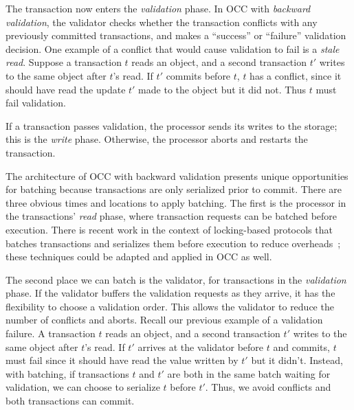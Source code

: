 The transaction now enters the \emph{validation} phase. In OCC with \emph{backward validation}, the validator checks whether the transaction conflicts with any previously committed transactions, and makes a ``success'' or ``failure'' validation decision. One example of a conflict that would cause validation to fail is a \emph{stale read}. Suppose a transaction $t$ reads an object, and a second transaction $t'$ writes to the same object after $t$'s read. If $t'$ commits before $t$, $t$ has a conflict, since it should have read the update $t'$ made to the object but it did not. Thus $t$ must fail validation. 


If a transaction passes validation, the processor sends its writes to the storage; this is the \emph{write} phase. Otherwise, the processor aborts and restarts the transaction.

The architecture of OCC with backward validation presents unique opportunities for batching because transactions are only serialized prior to commit. 
There are three obvious times and locations to apply batching. The first is the processor in the transactions' \emph{read} phase, where transaction requests can be batched before execution. There is recent work in the context of locking-based protocols that  batches transactions and serializes them before execution to reduce overheads~\cite{thomson2012calvin,faleiro2014rethinking,mu2014extracting}; these techniques could be adapted and applied in OCC as well.

The second place we can batch is the validator, for transactions in the \emph{validation} phase. If the validator buffers the validation requests as they arrive, it has the flexibility to choose a validation order. This allows the validator to reduce the number of conflicts and aborts. Recall our previous example of a validation failure. A transaction $t$ reads an object, and a second transaction $t'$ writes to the same object after $t$'s read. If $t'$ arrives at the validator before $t$ and commits, $t$ must fail since it should have read the value written by $t'$ but it didn't. Instead, with batching, if transactions $t$ and $t'$ are both in the same batch waiting for validation, we can choose to serialize $t$ before $t'$. Thus, we avoid conflicts and both transactions can commit.

